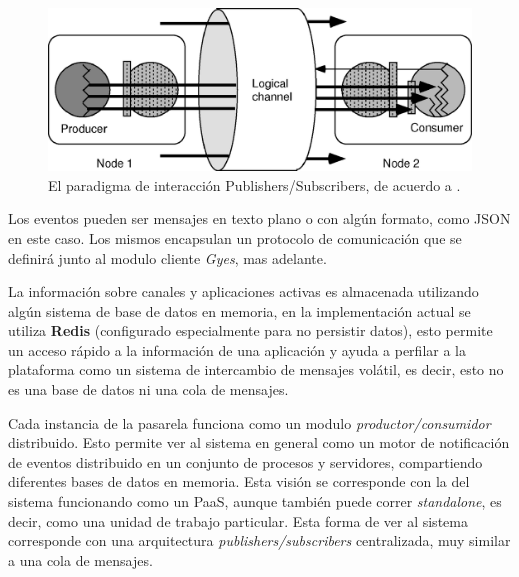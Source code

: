 \begin{center}
  \begin{figure}[h]
    \includegraphics[scale=1,width=\textwidth]{gfx/pubsub}
    \caption{El paradigma de interacción Publishers/Subscribers, de acuerdo a \citet{Kermarrec2003}.}
    \label{fig:infra_pubsub}
  \end{figure}
\end{center}

Los eventos pueden ser mensajes en texto plano o con algún formato, como JSON en este caso. Los mismos encapsulan un protocolo de comunicación que se definirá junto al modulo cliente \emph{Gyes}, mas adelante. 

La información sobre canales y aplicaciones activas es almacenada utilizando algún sistema de base de datos en memoria, en la implementación actual se utiliza \textbf{Redis} (configurado especialmente para no persistir datos), esto permite un acceso rápido a la información de una aplicación y ayuda a perfilar a la plataforma como un sistema de intercambio de mensajes volátil, es decir, esto no es una base de datos ni una cola de mensajes. 

Cada instancia de la pasarela funciona como un modulo \emph{productor/consumidor} distribuido. Esto permite ver al sistema en general como un motor de notificación de eventos distribuido en un conjunto de procesos y servidores, compartiendo diferentes bases de datos en memoria. Esta visión se corresponde con la del sistema funcionando como un PaaS, aunque también puede correr \emph{standalone}, es decir, como una unidad de trabajo particular. Esta forma de ver al sistema corresponde con una arquitectura \emph{publishers/subscribers} centralizada, muy similar a una cola de mensajes. 


